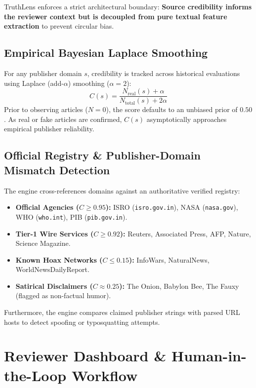 \documentclass[11pt,a4paper]{article}
\begin{document}
TruthLens enforces a strict architectural boundary: \textbf{Source credibility informs the reviewer context but is decoupled from pure textual feature extraction} to prevent circular bias.

\subsection{Empirical Bayesian Laplace Smoothing}
For any publisher domain $s$, credibility is tracked across historical evaluations using Laplace (add-$\alpha$) smoothing ($\alpha = 2$):
\begin{equation}
C(s) = \frac{N_{\text{real}}(s) + \alpha}{N_{\text{total}}(s) + 2\alpha}
\end{equation}
Prior to observing articles ($N=0$), the score defaults to an unbiased prior of $0.50$. As real or fake articles are confirmed, $C(s)$ asymptotically approaches empirical publisher reliability.

\subsection{Official Registry \& Publisher-Domain Mismatch Detection}
The engine cross-references domains against an authoritative verified registry:
\begin{itemize}[noitemsep]
    \item \textbf{Official Agencies ($C \ge 0.95$):} ISRO (\texttt{isro.gov.in}), NASA (\texttt{nasa.gov}), WHO (\texttt{who.int}), PIB (\texttt{pib.gov.in}).
    \item \textbf{Tier-1 Wire Services ($C \ge 0.92$):} Reuters, Associated Press, AFP, Nature, Science Magazine.
    \item \textbf{Known Hoax Networks ($C \le 0.15$):} InfoWars, NaturalNews, WorldNewsDailyReport.
    \item \textbf{Satirical Disclaimers ($C \approx 0.25$):} The Onion, Babylon Bee, The Fauxy (flagged as non-factual humor).
\end{itemize}
Furthermore, the engine compares claimed publisher strings with parsed URL hosts to detect spoofing or typosquatting attempts.

\section{Reviewer Dashboard \& Human-in-the-Loop Workflow}
\end{document}

